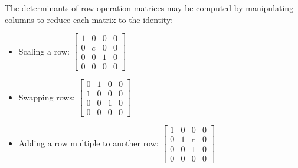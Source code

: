 \begin{remark}
The determinants of row operation matrices may be computed
by manipulating columns to reduce each matrix to the identity:
\begin{itemize}
\item Scaling a row: \(  
  \begin{bmatrix}
  1 & 0 & 0 &0  \\
  0 & c & 0 &0\\
  0 & 0 & 1 &0 \\
  0 & 0 & 0 & 0
  \end{bmatrix}
\)
\item Swapping rows: \(
  \begin{bmatrix}
  0 & 1 & 0 &0 \\
  1 & 0 & 0 & 0\\
  0 & 0 & 1 & 0 \\
  0 & 0 & 0 & 0
  \end{bmatrix}
\)
\item Adding a row multiple to another row: \(
  \begin{bmatrix}
  1 & 0 & 0 & 0\\
  0 & 1 & c & 0\\
  0 & 0 & 1 & 0 \\
  0 & 0 & 0 & 0
  \end{bmatrix}
\)
\end{itemize}
\end{remark}
